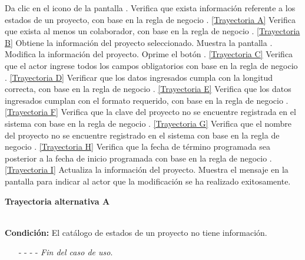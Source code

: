 	\begin{UCtrayectoria}
		\UCpaso[\UCactor] Da clic en el icono \editar de la pantalla .
		\UCpaso[\UCsist] Verifica que exista información referente a los estados de un proyecto, con base en la regla de negocio . \hyperlink{CU2-2:TAA}{[Trayectoria A]}
		\UCpaso[\UCsist] Verifica que exista al menos un colaborador, con base en la regla de negocio . \hyperlink{CU2-2:TAB}{[Trayectoria B]}
		\UCpaso[\UCsist] Obtiene la información del proyecto seleccionado.
		\UCpaso[\UCsist] Muestra la pantalla .
		\UCpaso[\UCactor] Modifica la información del proyecto. \label{CU2.2-P5}
		\UCpaso[\UCactor] Oprime el botón . \hyperlink{CU2-2:TAC}{[Trayectoria C]}
		\UCpaso[\UCsist] Verifica que el actor ingrese todos los campos obligatorios con base en la regla de negocio . \hyperlink{CU2-2:TAD}{[Trayectoria D]}
		\UCpaso[\UCsist] Verificar que los datos ingresados cumpla con la longitud correcta, con base en la regla de negocio . \hyperlink{CU2-2:TAE}{[Trayectoria E]}
		\UCpaso[\UCsist] Verifica que los datos ingresados cumplan con el formato requerido, con base en la regla de negocio . \hyperlink{CU2-2:TAF}{[Trayectoria F]}
		\UCpaso[\UCsist] Verifica que la clave del proyecto no se encuentre registrada en el sistema con base en la regla de negocio . \hyperlink{CU2-2:TAG}{[Trayectoria G]}
		\UCpaso[\UCsist] Verifica que el nombre del proyecto no se encuentre registrado en el sistema con base en la regla de negocio . \hyperlink{CU2-2:TAH}{[Trayectoria H]}
		\UCpaso[\UCsist] Verifica que la fecha de término programada sea posterior a la fecha de inicio programada con base en la regla de negocio . \hyperlink{CU2-2:TAI}{[Trayectoria I]}
		\UCpaso[\UCsist] Actualiza la información del proyecto.
		\UCpaso[\UCsist] Muestra el mensaje  en la pantalla  para indicar al actor que la modificación se ha realizado exitosamente.
	\end{UCtrayectoria}		
	\hypertarget{CU2-2:TAA}{\textbf{Trayectoria alternativa A}}\\
	\noindent \textbf{Condición:} El catálogo de estados de un proyecto no tiene información.
	\begin{enumerate}
		\UCpaso[\UCsist] Muestra el mensaje  en la pantalla  para indicar que no es posible realizar la operación debido a la falta de información necesaria para el sistema.
		\item[- -] - - {\em {Fin del caso de uso}}.%
	\end{enumerate}
	
